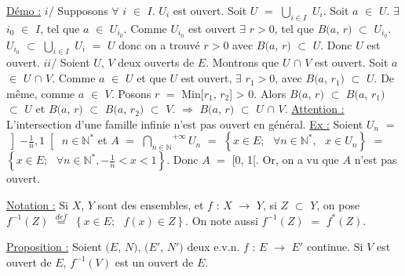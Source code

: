 \documentclass{article}
\begin{document}
\parindent=0cm
\smallbreak
\underline{Démo :} \parindent=1cm \smallbreak
$i/$ Supposons $\forall$ $i$ $\in$ $I$. $U_i$ est ouvert. Soit $U$ $=$ $\underset{i\in I}{\bigcup}$ $U_i$. Soit $a$ $\in$ $U$. $\exists$ $i_0$ $\in$ $I$, tel que $a$ $\in$ $U_{i_{0}}$. Comme $U_{i_{0}}$ est \smallbreak ouvert $\exists$ $r>0$, tel que $B(a$, $r)$ $\subset$ $U_{i_{0}}$.
$U_{i_{0}}$ $\subset$ $\underset{i\in I}{\bigcup}$ $U_i$ $=$
$U$ donc on a trouvé $r>0$ avec $B(a$, $r)$ $\subset$ $U$.
Donc $U$ \smallbreak est ouvert.
\smallbreak
$ii/$ Soient $U$, $V$ deux ouverts de $E$. Montrons que $U$ $\cap$ $V$ est ouvert. Soit $a$ $\in$ $U$ $\cap$ $V$. Comme $a$ $\in$ $U$ et que \smallbreak $U$ est ouvert, $\exists$ $r_1>0$, avec $B(a$, $r_1)$ $\subset$ $U$. De même, comme $a$ $\in$ $V$. Posons $r$ $=$ Min[$r_1$, $r_2$] > 0.
\smallbreak Alors $B(a$, $r)$ $\subset$ $B(a$, $r_1)$ $\subset$ $U$ et  
$B(a$, $r)$ $\subset$ $B(a$, $r_2)$ $\subset$ $V$. $\Longrightarrow$ $B(a$, $r)$  $\subset$ $U$ $\cap$ $V$.
\parindent=0cm
\smallbreak
\underline{Attention :} \parindent=1cm \smallbreak
L'intersection d'une famille infinie n'est pas ouvert en général.
\parindent=0cm
\smallbreak
\underline{Ex :} \parindent=1cm \smallbreak
Soient $U_n$ $=$ $\left] -\frac{1}{n}, 1 \right[$ $n \in \mathbb{N}^*$ et $A$ $=$ $\overset{+\infty}{\underset{n \in \mathbb{N}}{\bigcap}}U_n$ $=$  $\left\{ x \in E;\text{ } \forall n \in \mathbb{N}^*, \text{ } x \in U_n \right\}$ $=$ $\left\{ x \in E;\text{ } \forall n \in \mathbb{N}^*, -\frac{1}{n} < x < 1\right\}$. \smallbreak Donc $A$ $=$ [0, 1[. Or, on a vu que $A$ n'est pas ouvert.

\parindent=0cm
\smallbreak
\underline{Notation :} \parindent=1cm \smallbreak
Si $X$, $Y$ sont des ensembles, et $f$ : $X$ $\longrightarrow$  $Y$, si $Z$ $\subset$ $Y$, on pose $f^{-1}(Z)$ $\overset{ def }{=}$ $\left\{ x \in E;\text{ } f(x) \in Z \right\}$. On note \smallbreak aussi $f^{-1}(Z)$ $=$ $f^{*}(Z)$.

\parindent=0cm
\smallbreak
\underline{Proposition :} \parindent=1cm \smallbreak
Soient $(E$, $N)$, $(E'$, $N')$ deux e.v.n. $f$ : $E$ $\rightarrow$ $E'$ continue. Si $V$ est ouvert de $E$, $f^{-1}(V)$ est un ouvert de $E$.
\end{document}
